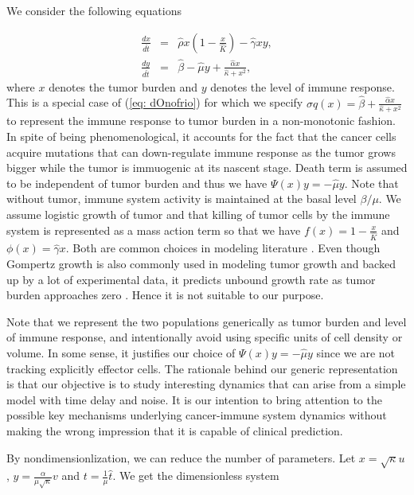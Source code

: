\documentclass{aims}
\theoremstyle{definition}
\begin{document}
We consider the following equations 

\begin{eqnarray}
\frac{dx}{d\hat{t}} & = & \hat{\rho}x(1-\frac{x}{\hat{K}})-\hat{\gamma}xy,\\
\frac{dy}{d\hat{t}} & = & \hat{\beta}-\hat{\mu}y+\frac{\hat{\alpha}x}{\hat{\kappa}+x^{2}},
\end{eqnarray}
 where $x$ denotes the tumor burden and $y$ denotes the level of
immune response. This is a special case of (\ref{eq: dOnofrio}) for
which we specify $\sigma q(x)=\hat{\beta}+\frac{\hat{\alpha}x}{\hat{\kappa}+x^{2}}$
to represent the immune response to tumor burden in a non-monotonic
fashion. In spite of being phenomenological, it accounts for the fact
that the cancer cells acquire mutations that can down-regulate immune
response as the tumor grows bigger while the tumor is immuogenic at
its nascent stage. Death term is assumed to be independent of tumor
burden and thus we have $\Psi(x)y=-\hat{\mu}y$. Note that without
tumor, immune system activity is maintained at the basal level $\beta/\mu$.
We assume logistic growth of tumor and that killing of tumor cells
by the immune system is represented as a mass action term so that
we have $f(x)=1-\frac{x}{\hat{K}}$ and $\phi(x)=\hat{\gamma}x$.
Both are common choices in modeling literature \cite{galach2003dynamics,Nikolopoulou2018}.
Even though Gompertz growth is also commonly used in modeling tumor
growth and backed up by a lot of experimental data, it predicts unbound
growth rate as tumor burden approaches zero \cite{Eftimie2011}. Hence
it is not suitable to our purpose. 

Note that we represent the two populations generically as tumor burden
and level of immune response, and intentionally avoid using specific
units of cell density or volume. In some sense, it justifies our choice
of $\Psi(x)y=-\hat{\mu}y$ since we are not tracking explicitly effector
cells. The rationale behind our generic representation is that our
objective is to study interesting dynamics that can arise from a simple
model with time delay and noise. It is our intention to bring attention
to the possible key mechanisms underlying cancer-immune system dynamics
without making the wrong impression that it is capable of clinical
prediction. 

By nondimensionlization, we can reduce the number of parameters. Let
$x=\sqrt{\kappa}u$, $y=\frac{\alpha}{\mu\sqrt{\kappa}}v$ and $t=\frac{1}{\mu}\hat{t}$.
We get the dimensionless system 
\end{document}
